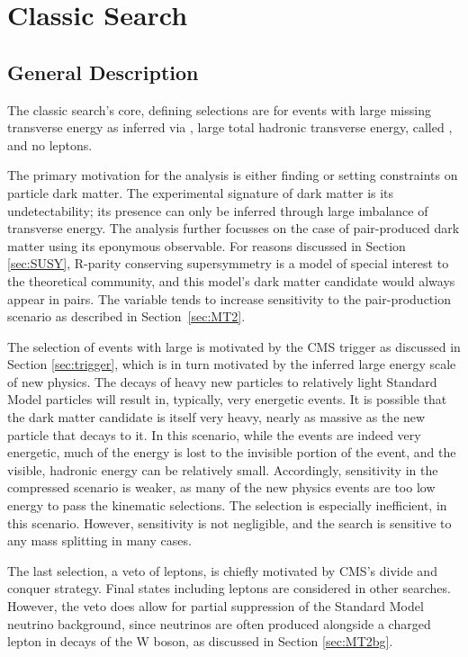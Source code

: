 \section{Classic Search} \label{sec:MT2classic}

  \subsection{General Description} \label{sec:classicdescription}

  The classic search's core, defining selections are for events with large missing transverse energy \met as inferred via \mttwo, large total hadronic transverse energy, called \Ht, and no leptons.

  The primary motivation for the analysis is either finding or setting constraints on particle dark matter.
  The experimental signature of dark matter is its undetectability; its presence can only be inferred through large imbalance of transverse energy.
  The \mttwo analysis further focusses on the case of pair-produced dark matter using its eponymous observable.
  For reasons discussed in Section \ref{sec:SUSY}, R-parity conserving supersymmetry is a model of special interest to the theoretical community, and this model's dark matter candidate would always appear in pairs.
  The \mttwo variable tends to increase sensitivity to the pair-production scenario as described in Section~\ref{sec:MT2}.

  The selection of events with large \Ht is motivated by the CMS trigger as discussed in Section \ref{sec:trigger}, which is in turn motivated by the inferred large energy scale of new physics.
  The decays of heavy new particles to relatively light Standard Model particles will result in, typically, very energetic events.
  It is possible that the dark matter candidate is itself very heavy, nearly as massive as the new particle that decays to it.
  In this scenario, while the events are indeed very energetic, much of the energy is lost to the invisible portion of the event, and the visible, hadronic energy can be relatively small.
  Accordingly, sensitivity in the compressed scenario is weaker, as many of the new physics events are too low energy to pass the kinematic selections.
  The \mttwo selection is especially inefficient, in this scenario.
  However, sensitivity is not negligible, and the search is sensitive to any mass splitting in many cases.
  
  The last selection, a veto of leptons, is chiefly motivated by CMS's divide and conquer strategy.
  Final states including leptons are considered in other searches.
  However, the veto does allow for partial suppression of the Standard Model neutrino background, since neutrinos are often produced alongside a charged lepton in decays of the W boson, as discussed in Section \ref{sec:MT2bg}.

